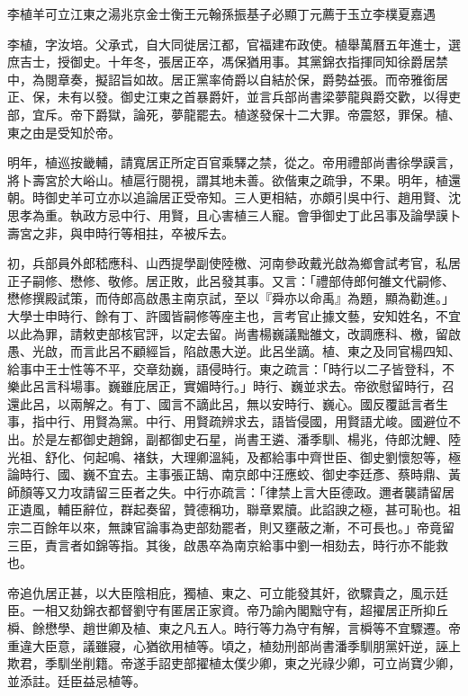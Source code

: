 
\begin{pinyinscope}
李植羊可立江東之湯兆京金士衡王元翰孫振基子必顯丁元薦于玉立李樸夏嘉遇

李植，字汝培。父承式，自大同徙居江都，官福建布政使。植舉萬曆五年進士，選庶吉士，授御史。十年冬，張居正卒，馮保猶用事。其黨錦衣指揮同知徐爵居禁中，為閱章奏，擬詔旨如故。居正黨率倚爵以自結於保，爵勢益張。而帝雅銜居正、保，未有以發。御史江東之首暴爵奸，並言兵部尚書梁夢龍與爵交歡，以得吏部，宜斥。帝下爵獄，論死，夢龍罷去。植遂發保十二大罪。帝震怒，罪保。植、東之由是受知於帝。

明年，植巡按畿輔，請寬居正所定百官乘驛之禁，從之。帝用禮部尚書徐學謨言，將卜壽宮於大峪山。植扈行閱視，謂其地未善。欲偕東之疏爭，不果。明年，植還朝。時御史羊可立亦以追論居正受帝知。三人更相結，亦頗引吳中行、趙用賢、沈思孝為重。執政方忌中行、用賢，且心害植三人寵。會爭御史丁此呂事及論學謨卜壽宮之非，與申時行等相拄，卒被斥去。

初，兵部員外郎嵇應科、山西提學副使陸檄、河南參政戴光啟為鄉會試考官，私居正子嗣修、懋修、敬修。居正敗，此呂發其事。又言：「禮部侍郎何雒文代嗣修、懋修撰殿試策，而侍郎高啟愚主南京試，至以『舜亦以命禹』為題，顯為勸進。」大學士申時行、餘有丁、許國皆嗣修等座主也，言考官止據文藝，安知姓名，不宜以此為罪，請敕吏部核官評，以定去留。尚書楊巍議黜雒文，改調應科、檄，留啟愚、光啟，而言此呂不顧經旨，陷啟愚大逆。此呂坐謫。植、東之及同官楊四知、給事中王士性等不平，交章劾巍，語侵時行。東之疏言：「時行以二子皆登科，不樂此呂言科場事。巍雖庇居正，實媚時行。」時行、巍並求去。帝欲慰留時行，召還此呂，以兩解之。有丁、國言不謫此呂，無以安時行、巍心。國反覆詆言者生事，指中行、用賢為黨。中行、用賢疏辨求去，語皆侵國，用賢語尤峻。國避位不出。於是左都御史趙錦，副都御史石星，尚書王遴、潘季馴、楊兆，侍郎沈鯉、陸光祖、舒化、何起鳴、褚鈇，大理卿溫純，及都給事中齊世臣、御史劉懷恕等，極論時行、國、巍不宜去。主事張正鵠、南京郎中汪應蛟、御史李廷彥、蔡時鼎、黃師顏等又力攻請留三臣者之失。中行亦疏言：「律禁上言大臣德政。邇者襲請留居正遺風，輔臣辭位，群起奏留，贊德稱功，聯章累牘。此諂諛之極，甚可恥也。祖宗二百餘年以來，無諫官論事為吏部劾罷者，則又壅蔽之漸，不可長也。」帝竟留三臣，責言者如錦等指。其後，啟愚卒為南京給事中劉一相劾去，時行亦不能救也。

帝追仇居正甚，以大臣陰相庇，獨植、東之、可立能發其奸，欲驟貴之，風示廷臣。一相又劾錦衣都督劉守有匿居正家資。帝乃諭內閣黜守有，超擢居正所抑丘橓、餘懋學、趙世卿及植、東之凡五人。時行等力為守有解，言橓等不宜驟遷。帝重違大臣意，議雖寢，心猶欲用植等。頃之，植劾刑部尚書潘季馴朋黨奸逆，誣上欺君，季馴坐削籍。帝遂手詔吏部擢植太僕少卿，東之光祿少卿，可立尚寶少卿，並添註。廷臣益忌植等。


\end{pinyinscope}
